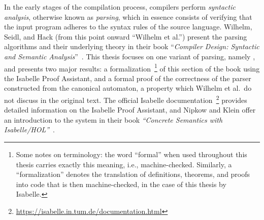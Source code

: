 %
\begin{isabellebody}%
%
%
\isadelimtheory
%
\endisadelimtheory
%
\isatagtheory
%
\endisatagtheory
{\isafoldtheory}%
%
\isadelimtheory
%
\endisadelimtheory
%
\isadelimdocument
%
\endisadelimdocument
%
\isatagdocument
%
\isamarkuptrue%
%
\endisatagdocument
{\isafolddocument}%
%
\isadelimdocument
%
\endisadelimdocument
%
\begin{isamarkuptext}%
In the early stages of the compilation process, compilers perform \emph{syntactic analysis},
otherwise known as \emph{parsing}, which in essence consists of verifying that the input program
adheres to the syntax rules of the source language. Wilhelm, Seidl, and Hack (from this point onward
``Wilhelm et al.'') present the  parsing algorithms and their underlying theory in their book 
``\emph{Compiler Design: Syntactic and Semantic Analysis}''~\cite{Wilhelm}. This
thesis focuses on one variant of  parsing, namely , and presents two major results:
a formalization~\footnote{Some notes on terminology: the word ``formal'' when used throughout this
thesis carries exactly this meaning, i.e., machine-checked. Similarly, a ``formalization'' denotes
the translation of definitions, theorems, and proofs into code that is then machine-checked, in the
case of this thesis by Isabelle.} of this section of the book using the Isabelle Proof Assistant,
and a formal proof of the correctness of the parser constructed from the canonical  automaton,
a property which Wilhelm et al.\ do not discuss in the original text. The official Isabelle
documentation~\footnote{\url{https://isabelle.in.tum.de/documentation.html}} provides detailed
information on the Isabelle Proof Assistant, and Nipkow and Klein offer an introduction to the
system in their book \emph{``Concrete Semantics with Isabelle/HOL''}~\cite{Nipkow-Book}.


\end{isamarkuptext}
\end{isabellebody}
